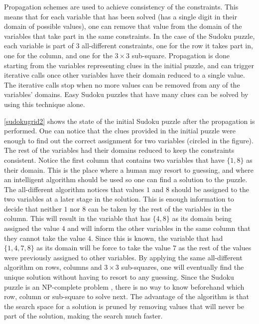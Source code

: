 \documentclass{l4proj}
\begin{document}
\noindent Propagation schemes are used to achieve consistency of the constraints. This means that for each variable that has been solved (has a single digit in their domain of possible values), one can remove that value from the domain of the variables that take part in the same constraints. In the case of the Sudoku puzzle, each variable is part of $3$ all-different constraints, one for the row it takes part in, one for the column, and one for the $3\times 3$ sub-square. Propagation is done starting from the variables representing clues in the initial puzzle, and can trigger iterative calls once other variables have their domain reduced to a single value. The iterative calls stop when no more values can be removed from any of the variables' domains. Easy Sudoku puzzles that have many clues \cite{gomes2002completing} can be solved by using this technique alone.

\noindent \ref{sudokugrid2} shows the state of the initial Sudoku puzzle after the propagation is performed. One can notice that the clues provided in the initial puzzle were enough to find out the correct assignment for two variables (circled in the figure). The rest of the variables had their domains reduced to keep the constraints consistent. Notice the first column that contains two variables that have $\{1, 8\}$ as their domain. This is the place where a human may resort to guessing, and where an intelligent algorithm should be used so one can find a solution to the puzzle. The all-different algorithm notices that values $1$ and $8$ should be assigned to the two variables at a later stage in the solution. This is enough information to decide that neither $1$ nor $8$ can be taken by the rest of the variables in the column. This will result in the variable that has $\{4, 8\}$ as its domain being assigned the value $4$ and will inform the other variables in the same column that they cannot take the value $4$. Since this is known, the variable that had $\{1, 4, 7, 8\}$ as its domain will be force to take the value $7$ as the rest of the values were previously assigned to other variables. By applying the same all-different algorithm on rows, columns and $3\times 3$ sub-squares, one will eventually find the unique solution without having to resort to any guessing. Since the Sudoku puzzle is an NP-complete problem \cite{colbourn1984complexity}, there is no way to know beforehand which row, column or sub-square to solve next. The advantage of the algorithm is that the search space for a solution is pruned by removing values that will never be part of the solution, making the search much faster.
\end{document}
